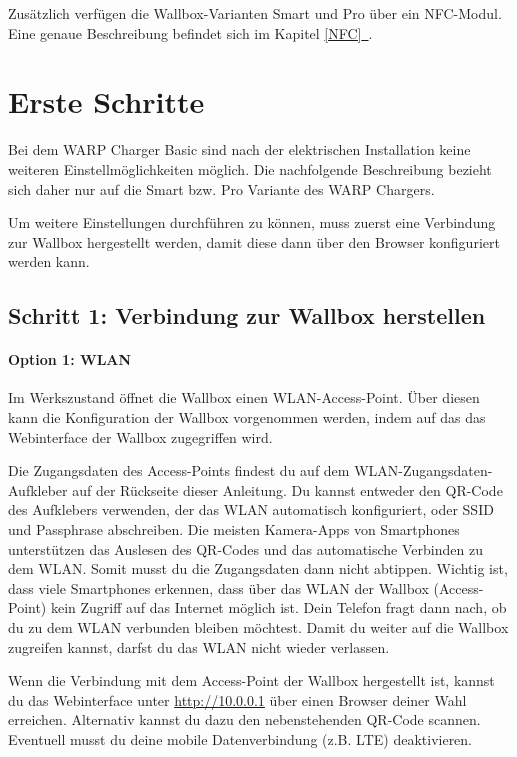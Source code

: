 \documentclass[a4paper,10pt]{article}
\newcommand*{\fullref}[1]{\hyperref[{#1}]{\ref*{#1}~\nameref*{#1}}}
\begin{document}
\begin{multicols*}{2}
	Zusätzlich verfügen die Wallbox-Varianten Smart und Pro über ein NFC-Modul. Eine
	genaue Beschreibung befindet sich im Kapitel \fullref{NFC}.

	\newpage
	\section{Erste Schritte}\label{setup}

	Bei dem WARP Charger Basic sind nach der elektrischen Installation
	keine weiteren Einstellmöglichkeiten möglich. Die nachfolgende
	Beschreibung bezieht sich daher nur auf die Smart bzw. Pro Variante des WARP
	Chargers.

	Um weitere Einstellungen durchführen zu können, muss zuerst eine Verbindung
	zur Wallbox hergestellt werden, damit diese dann über den Browser
	konfiguriert werden kann.

	\subsection{Schritt 1: Verbindung zur Wallbox herstellen}

	\paragraph{Option 1: WLAN}
	Im Werkszustand öffnet die Wallbox einen WLAN-Access-Point. Über diesen kann
	die Konfiguration der Wallbox vorgenommen werden, indem auf das
	das Webinterface der Wallbox zugegriffen wird.

	Die Zugangsdaten des Access-Points findest du auf dem WLAN-Zugangsdaten-Aufkleber
	auf der Rückseite dieser Anleitung. Du kannst entweder den QR-Code des Aufklebers verwenden,
	der das WLAN automatisch konfiguriert, oder SSID und Passphrase abschreiben.
	Die meisten Kamera-Apps von Smartphones unterstützen das Auslesen des
	QR-Codes und das automatische Verbinden zu dem WLAN. Somit musst du die
	Zugangsdaten dann nicht abtippen. Wichtig ist, dass viele Smartphones
	erkennen, dass über das WLAN der Wallbox (Access-Point) kein Zugriff auf das
	Internet möglich ist. Dein Telefon fragt dann nach, ob du zu dem WLAN
	verbunden bleiben möchtest. Damit du weiter auf die Wallbox zugreifen
	kannst, darfst du das WLAN nicht wieder verlassen.

	\begin{minipage}{0.35\textwidth}
		Wenn die Verbindung mit dem Access-Point der Wallbox hergestellt ist, kannst du das Webinterface
		unter \url{http://10.0.0.1} über einen Browser deiner Wahl erreichen.
		Alternativ kannst du dazu den nebenstehenden QR-Code scannen.
		Eventuell musst du deine mobile Datenverbindung (z.B. LTE) deaktivieren.
	\end{minipage}\hfill
	\begin{minipage}{0.12\textwidth}
		\begin{flushright}
		\end{flushright}
	\end{minipage}


\end{multicols*}
\end{document}
